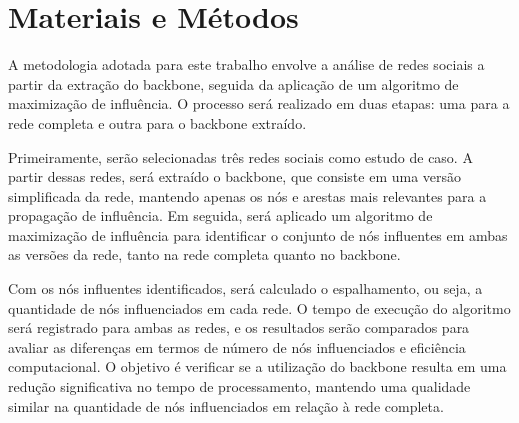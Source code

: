 \documentclass[12pt]{article}
\begin{document}
     
         
    
    

\section{Materiais e Métodos}

A metodologia adotada para este trabalho envolve a análise de redes sociais a partir da extração do backbone, seguida da aplicação de um algoritmo de maximização de influência. O processo será realizado em duas etapas: uma para a rede completa e outra para o backbone extraído.

Primeiramente, serão selecionadas três redes sociais como estudo de caso. A partir dessas redes, será extraído o backbone, que consiste em uma versão simplificada da rede, mantendo apenas os nós e arestas mais relevantes para a propagação de influência. Em seguida, será aplicado um algoritmo de maximização de influência para identificar o conjunto de nós influentes em ambas as versões da rede, tanto na rede completa quanto no backbone.

Com os nós influentes identificados, será calculado o espalhamento, ou seja, a quantidade de nós influenciados em cada rede. O tempo de execução do algoritmo será registrado para ambas as redes, e os resultados serão comparados para avaliar as diferenças em termos de número de nós influenciados e eficiência computacional. O objetivo é verificar se a utilização do backbone resulta em uma redução significativa no tempo de processamento, mantendo uma qualidade similar na quantidade de nós influenciados em relação à rede completa.  
\end{document}
